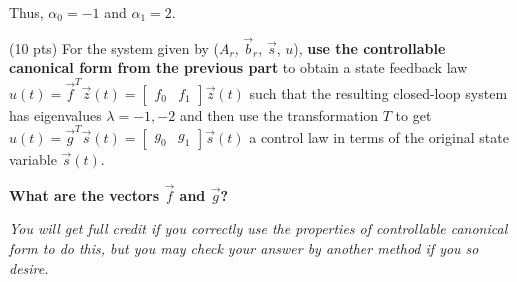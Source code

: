 \begin{enumerate}
{Thus, $\alpha_0 = -1$ and $\alpha_1 = 2$.
}
\newpage

\qitem (10 pts) 
For the system given by ($A_r$, $\vec{b}_r$, $\vec{s}$, $u$), {\bf use the
controllable canonical form from the
previous part} to obtain a state feedback law $u(t) = \vec{f}^T
\vec{z}(t) = \begin{bmatrix} 
f_0 & f_1
\end{bmatrix} \vec{z}(t)$ such that the resulting closed-loop system
has eigenvalues $\lambda = -1, -2$ and then use the transformation $T$
to get $u(t) = \vec{g}^T \vec{s}(t) =  \begin{bmatrix} 
g_0 & g_1
\end{bmatrix} \vec{s}(t)$ a control law in terms of the original state
variable $\vec{s}(t)$. 

{\bf What are the vectors $\vec{f}$ and $\vec{g}$?}

{\em You will get full credit if you correctly use the properties of
  controllable canonical form to do this, but you may check your
  answer by another method if you so desire.}

\end{enumerate}

